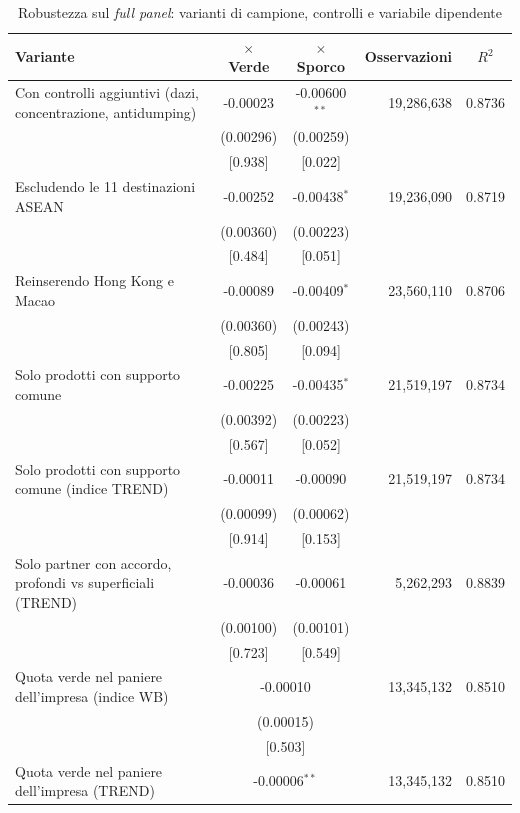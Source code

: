 \begin{table}[htbp]
\centering
\footnotesize
\caption{Robustezza sul \emph{full panel}: varianti di campione, controlli e variabile dipendente}
\label{tab:robust-full}
\begin{threeparttable}
\begin{tabular}{lccrc}
\toprule
Variante & $\times$ Verde & $\times$ Sporco & Osservazioni & $R^2$ \\
\midrule
Con controlli aggiuntivi (dazi, concentrazione, antidumping) & -0.00023 & -0.00600$^{**}$ & 19,286,638 & 0.8736 \\
 & (0.00296) & (0.00259) & & \\
 & [0.938] & [0.022] & & \\
\addlinespace
Escludendo le 11 destinazioni ASEAN & -0.00252 & -0.00438$^{*}$ & 19,236,090 & 0.8719 \\
 & (0.00360) & (0.00223) & & \\
 & [0.484] & [0.051] & & \\
\addlinespace
Reinserendo Hong Kong e Macao & -0.00089 & -0.00409$^{*}$ & 23,560,110 & 0.8706 \\
 & (0.00360) & (0.00243) & & \\
 & [0.805] & [0.094] & & \\
\addlinespace
Solo prodotti con supporto comune & -0.00225 & -0.00435$^{*}$ & 21,519,197 & 0.8734 \\
 & (0.00392) & (0.00223) & & \\
 & [0.567] & [0.052] & & \\
\addlinespace
Solo prodotti con supporto comune (indice TREND) & -0.00011 & -0.00090 & 21,519,197 & 0.8734 \\
 & (0.00099) & (0.00062) & & \\
 & [0.914] & [0.153] & & \\
\addlinespace
Solo partner con accordo, profondi vs superficiali (TREND) & -0.00036 & -0.00061 & 5,262,293 & 0.8839 \\
 & (0.00100) & (0.00101) & & \\
 & [0.723] & [0.549] & & \\
\addlinespace
Quota verde nel paniere dell'impresa (indice WB) & \multicolumn{2}{c}{-0.00010} & 13,345,132 & 0.8510 \\
 & \multicolumn{2}{c}{(0.00015)} & & \\
 & \multicolumn{2}{c}{[0.503]} & & \\
\addlinespace
Quota verde nel paniere dell'impresa (TREND) & \multicolumn{2}{c}{-0.00006$^{**}$} & 13,345,132 & 0.8510 \\

\end{tabular}
\end{threeparttable}
\end{table}
